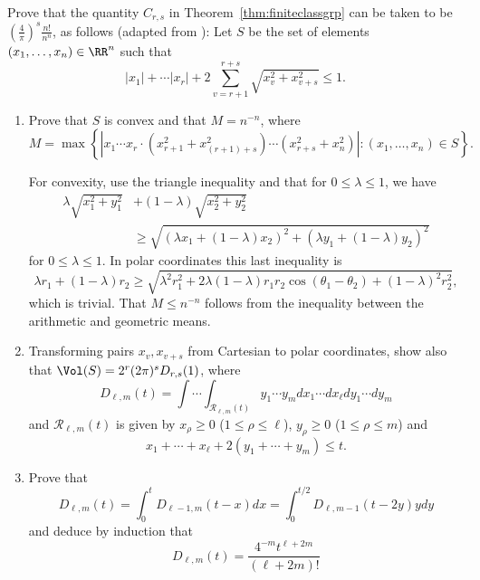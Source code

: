 \begin{exercise}\label{ex:canchooseSright}
	Prove that the quantity $C_{r,s}$ in Theorem~\ref{thm:finiteclassgrp}
	can be taken to be $\left(\frac{4}{\pi}\right)^{s} \frac{n!}{n^n}$,
	as follows (adapted from \cite[pg.~19]{sd:brief}):
	Let $S$ be the set of elements $(x_1,\dots, x_{n})\in\RR^n$ such that
	$$
	|x_1| + \cdots |x_{r}| +
	2 \sum_{v=r+1}^{r+s} \sqrt{x_v^2 + x_{v+s}^2} \leq 1.
	$$
	\begin{enumerate}
		\item Prove that $S$ is convex and that $M=n^{-n}$, where 
		$$
		M = \max\left\{
		\left|x_1 \cdots x_r
		\cdot (x_{r+1}^2 + x_{(r+1)+s}^2) \cdots (x_{r+s}^2 + x_n^2)\right|
		\colon (x_1,\dots, x_n) \in S
		\right\}.
		$$
		
		\begin{hint}
			For convexity, use the triangle inequality and that for
			$0\leq \lambda \leq 1$, we have
			\begin{align*}
			\lambda\sqrt{x_1^2 + y_1^2} &+ (1-\lambda)\sqrt{x_2^2+y_2^2} \\
			&\geq\sqrt{(\lambda x_1 + (1 - \lambda)x_2)^2
				+ (\lambda y_1 + (1 - \lambda)y_2)^2}
			\end{align*}
			for $0\leq \lambda \leq 1$.  In polar coordinates this last inequality
			is 
			$$
			\lambda r_1 + (1-\lambda)r_2 \geq  \sqrt{
				\lambda^2 r_1^2
				+ 2\lambda(1 - \lambda) r_1 r_2 \cos(\theta_1 - \theta_2)
				+ (1 - \lambda)^2 r_2^2
			},
			$$
			which is trivial.  That $M\leq n^{-n}$ follows from the inequality
			between the arithmetic and geometric means.
		\end{hint}
		\item Transforming pairs $x_v, x_{v+s}$ from Cartesian to polar coordinates,
		show also that $\Vol(S) = 2^{r}(2\pi)^s D_{r,s}(1)$, where
		$$
		D_{\ell,m}(t) = \int \cdots \int_{\mathcal{R}_{\ell,m}(t)}
		y_1 \cdots y_m dx_1 \cdots dx_{\ell} dy_1 \cdots dy_m
		$$
		and 
		$\mathcal{R}_{\ell,m}(t)$ is given by $x_{\rho}\geq 0$
		($1\leq \rho\leq \ell$), $y_{\rho}\geq 0$ ($1\leq \rho\leq m$) and 
		$$
		x_1 + \cdots + x_{\ell} + 2(y_1+\cdots +y_m) \leq t.
		$$
		\item Prove that
		$$
		D_{\ell,m}(t) = \int_{0}^t D_{\ell-1,m}(t-x)dx
		= \int_{0}^{t/2} D_{\ell,m-1}(t-2y)y dy
		$$
		and deduce by induction that 
		$$
		D_{\ell,m}(t) = \frac{4^{-m}t^{\ell+2m}}{(\ell+2m)!}
		$$
	\end{enumerate}
\end{exercise}

